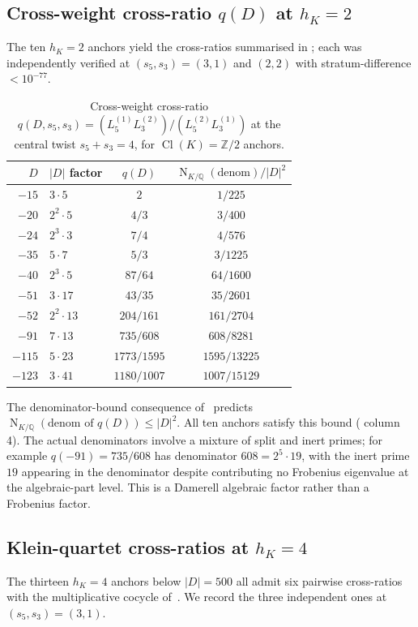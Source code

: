 \documentclass[11pt]{amsart}
\theoremstyle{definition}
\theoremstyle{remark}
\DeclareMathOperator{\Cl}{Cl}
\DeclareMathOperator{\Nm}{N}
\newcommand{\Q}{\mathbb{Q}}
\newcommand{\Z}{\mathbb{Z}}
\begin{document}
\subsection{Cross-weight cross-ratio $q(D)$ at $h_K = 2$}\label{ss:q-table}
The ten $h_K = 2$ anchors yield the cross-ratios summarised in
; each was independently verified at $(s_5, s_3) =
(3,1)$ and $(2,2)$ with stratum-difference $< 10^{-77}$.

\begin{table}[h!]
\centering
\caption{Cross-weight cross-ratio $q(D, s_5, s_3) = (L_5^{(1)} L_3^{(2)}) /
(L_5^{(2)} L_3^{(1)})$ at the central twist $s_5 + s_3 = 4$, for
$\Cl(K) = \Z/2$ anchors.}
\label{tab:q-h2}
\begin{tabular}{rlcc}
\toprule
$D$ & $|D|$ factor & $q(D)$ & $\Nm_{K/\Q}(\text{denom}) / |D|^2$ \\
\midrule
$-15$ & $3 \cdot 5$ & $2$ & $1/225$ \\
$-20$ & $2^2 \cdot 5$ & $4/3$ & $3/400$ \\
$-24$ & $2^3 \cdot 3$ & $7/4$ & $4/576$ \\
$-35$ & $5 \cdot 7$ & $5/3$ & $3/1225$ \\
$-40$ & $2^3 \cdot 5$ & $87/64$ & $64/1600$ \\
$-51$ & $3 \cdot 17$ & $43/35$ & $35/2601$ \\
$-52$ & $2^2 \cdot 13$ & $204/161$ & $161/2704$ \\
$-91$ & $7 \cdot 13$ & $735/608$ & $608/8281$ \\
$-115$ & $5 \cdot 23$ & $1773/1595$ & $1595/13225$ \\
$-123$ & $3 \cdot 41$ & $1180/1007$ & $1007/15129$ \\
\bottomrule
\end{tabular}
\end{table}

The denominator-bound consequence of~ predicts
$\Nm_{K/\Q}(\text{denom of } q(D)) \leq |D|^2$. All ten anchors
satisfy this bound ( column 4). The actual denominators
involve a mixture of split and inert primes; for example $q(-91) =
735/608$ has denominator $608 = 2^5 \cdot 19$, with the inert prime
$19$ appearing in the denominator despite contributing no Frobenius
eigenvalue at the algebraic-part level. This is a Damerell algebraic
factor rather than a Frobenius factor.

\subsection{Klein-quartet cross-ratios at $h_K = 4$}\label{ss:klein-table}
The thirteen $h_K = 4$ anchors below $|D| = 500$ all admit six pairwise
cross-ratios with the multiplicative cocycle of~. We
record the three independent ones at $(s_5, s_3) = (3, 1)$.
\end{document}
